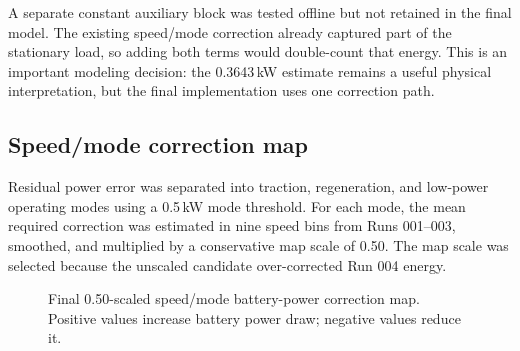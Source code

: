 \documentclass[11pt,letterpaper]{article}
\newcommand{\SI}[2]{#1\,#2}
\begin{document}
A separate constant auxiliary block was tested offline but not retained in the
final model. The existing speed/mode correction already captured part of the
stationary load, so adding both terms would double-count that energy. This is
an important modeling decision: the \SI{0.3643}{kW} estimate remains a useful
physical interpretation, but the final implementation uses one correction path.

\subsection{Speed/mode correction map}

Residual power error was separated into traction, regeneration, and low-power
operating modes using a \SI{0.5}{kW} mode threshold. For each mode, the mean
required correction was estimated in nine speed bins from Runs 001--003,
smoothed, and multiplied by a conservative map scale of 0.50. The map scale was
selected because the unscaled candidate over-corrected Run 004 energy.

\begin{figure}[!htbp]
\centering
{}
\caption{Final 0.50-scaled speed/mode battery-power correction map. Positive values increase battery power draw; negative values reduce it.}
\end{figure}
\end{document}
